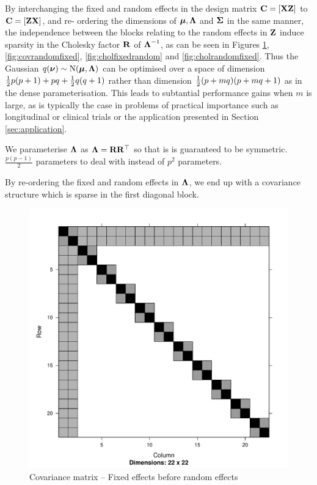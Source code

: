 \documentclass[times, doublespace]{anzsauth}
\begin{document}
	\noindent By interchanging the fixed and random effects in the design matrix ${\bf C} = [{\bf X} {\bf Z}]$ to ${\bf C} = [{\bf Z} {\bf X}]$, and re-
	ordering the dimensions of ${\boldsymbol \mu}, {\boldsymbol \Lambda}$ and ${\boldsymbol \Sigma}$ in the same manner, the independence between the
	blocks relating to the random effects in ${\bf Z}$ induce sparsity in the Cholesky factor ${\bf R}$ of
	${\boldsymbol \Lambda}^{-1}$, as can be seen in Figures \ref{fig:covfixedrandom}, \ref{fig:covrandomfixed},
	\ref{fig:cholfixedrandom} and \ref{fig:cholrandomfixed}. Thus the Gaussian $q({\boldsymbol \nu}) \sim \text{N}({\boldsymbol \mu}, {\boldsymbol \Lambda})$ can be optimised over a space of dimension
	$\tfrac{1}{2} p (p + 1) + pq + \tfrac{1}{2} q (q + 1)$ rather than dimension $\tfrac{1}{2} (p + mq) (p + mq + 1)$ as in the dense
	parameterisation. This leads to subtantial performance gains when $m$ is large, as is typically the case in
	problems of practical importance such as longitudinal or clinical trials or the application presented in
	Section \ref{sec:application}.
		
	\noindent We parameterise ${\boldsymbol \Lambda}$ as ${\boldsymbol \Lambda} = {\bf R} {\bf R}^\top$ so that is is guaranteed to be symmetric.
	$\frac{p(p-1)}{2}$ parameters to deal with instead of $p^2$ parameters.
		
	\noindent By re-ordering the fixed and random effects in ${\boldsymbol \Lambda}$, we end up with a covariance structure
	which is sparse in the first diagonal block.
	
	\begin{figure}[p]
		\caption{\tiny Covariance matrix -- Fixed effects before random effects}
		\label{fig:covfixedrandom}
		\includegraphics[scale=.25]{mX_mZ_mLambda.pdf}
	\end{figure}
	
\end{document}
